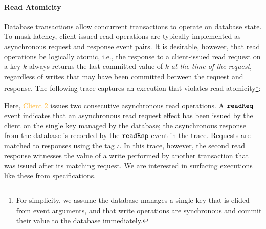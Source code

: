 \paragraph{Read Atomicity}
Database transactions allow concurrent transactions to operate on
database state.  To mask latency, client-issued read operations are
typically implemented as asynchronous request and response event
pairs.  It is desirable, however, that read operations be logically
atomic, i.e., the response to a client-issued read request on a key
$k$ always returns the last committed value of $k$ \emph{at the time
  of the request}, regardless of writes that may have been committed
between the request and response.
The following trace captures an
execution that violates read atomicity\footnote{For simplicity, we
  assume the database manages a single key that is elided from event
  arguments, and that write operations are synchronous and commit
  their value to the database immediately.}: %
\vspace{-.4cm} \par{}\vspace{-.5cm} \par\nobreak\noindent
  Here, \textcolor{orange}{Client 2} issues two consecutive asynchronous
  read operations.  A $\boldsymbol{{\tt readReq}}$ event indicates that an asynchronous
  read request effect has been issued by the client on the single key managed
  by the database; the asynchronous response
  from the database is recorded by the $\boldsymbol{{\tt readRsp}}$ event in the trace.  Requests
  are matched to responses using the tag $\iota$.  In this trace, however,
  the second read response witnesses the value of a write performed by another
  transaction that was issued after its matching request.   We are
  interested in surfacing executions like these from \tyName{}
  specifications.

